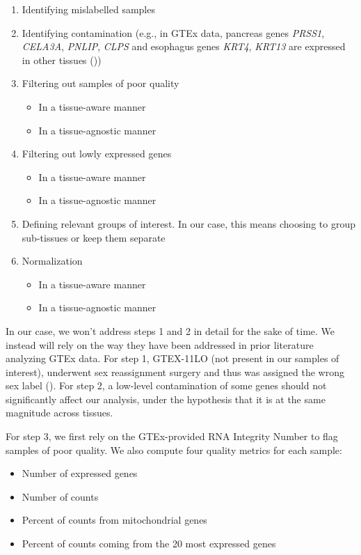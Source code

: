 \documentclass{article}
\begin{document}
\begin{enumerate}
  \item Identifying mislabelled samples
  \item Identifying contamination (e.g., in GTEx data, pancreas genes \textit{PRSS1}, \textit{CELA3A}, \textit{PNLIP}, \textit{CLPS} and esophagus genes \textit{KRT4}, \textit{KRT13} are expressed in other tissues (\cite{Nieuwenhuis2020-jp}))
  \item Filtering out samples of poor quality
  \begin{itemize}
    \item In a tissue-aware manner
    \item In a tissue-agnostic manner
  \end{itemize}
  \item Filtering out lowly expressed genes
  \begin{itemize}
    \item In a tissue-aware manner
    \item In a tissue-agnostic manner
  \end{itemize}
  \item Defining relevant groups of interest. In our case, this means choosing to group sub-tissues or keep them separate
  \item Normalization
  \begin{itemize}
    \item In a tissue-aware manner
    \item In a tissue-agnostic manner
  \end{itemize}
\end{enumerate}

In our case, we won't address steps 1 and 2 in detail for the sake of time. We instead will rely on the way they have been addressed in prior literature analyzing GTEx data. For step 1, GTEX-11LO (not present in our samples of interest), underwent sex reassignment surgery and thus was assigned the wrong sex label (\cite{Paulson2017-jv}). For step 2, a low-level contamination of some genes should not significantly affect our analysis, under the hypothesis that it is at the same magnitude across tissues.

For step 3, we first rely on the GTEx-provided RNA Integrity Number to flag samples of poor quality. We also compute four quality metrics for each sample:
\begin{itemize}
  \item Number of expressed genes
  \item Number of counts
  \item Percent of counts from mitochondrial genes
  \item Percent of counts coming from the 20 most expressed genes
\end{itemize}
\end{document}
